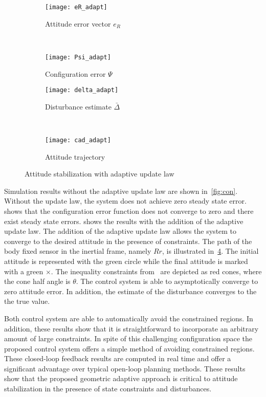 \documentclass[letterpaper, 10 pt, conference]{ieeeconf}  %
\begin{document}
\begin{figure} 
	\centering 
	\begin{subfigure}[htbp]{0.5\columnwidth} 
		\texttt{[image: eR\_adapt]} 
		\caption{Attitude error vector \(e_R\) } \label{fig:eR_adapt} 
	\end{subfigure}~ %
	\begin{subfigure}[htbp]{0.5\columnwidth} 
		\texttt{[image: Psi\_adapt]} 
		\caption{Configuration error \( \Psi \)} \label{fig:Psi_adapt} 
	\end{subfigure}
	
	\centering
	\begin{subfigure}[htbp]{0.5\columnwidth} 
		\texttt{[image: delta\_adapt]} 
		\caption{Disturbance estimate \( \bar \Delta \)} \label{fig:delta_adapt} 
	\end{subfigure}~
	\begin{subfigure}[htbp]{0.5\columnwidth} 
		\texttt{[image: cad\_adapt]} 
		\caption{Attitude trajectory} \label{fig:cad_adapt} 
	\end{subfigure}
	\caption{Attitude stabilization with adaptive update law}
	\label{fig:adapt} 
\end{figure}

Simulation results without the adaptive update law are shown in~\cref{fig:con}.
Without the update law, the system does not achieve zero steady state error. 
 shows that the configuration error function does not converge to zero and there exist steady state errors.
 shows the results with the addition of the adaptive update law.
The addition of the adaptive update law allows the system to converge to the desired attitude in the presence of constraints.
The path of the body fixed sensor in the inertial frame, namely \( R r \), is illustrated in~\cref{fig:cad_adapt}.
The initial attitude is represented with the green circle while the final attitude is marked with a green \(\times\).
The inequality constraints from~ are depicted as red cones, where the cone half angle is \( \theta \).
The control system is able to asymptotically converge to zero attitude error.
In addition, the estimate of the disturbance converges to the the true value.

Both control system are able to automatically avoid the constrained regions. 
In addition, these results show that it is straightforward to incorporate an arbitrary amount of large constraints.
In spite of this challenging configuration space the proposed control system offers a simple method of avoiding constrained regions.
These closed-loop feedback results are computed in real time and offer a significant advantage over typical open-loop planning methods.
These results show that the proposed geometric adaptive approach is critical to attitude stabilization in the presence of state constraints and disturbances.
\end{document}
